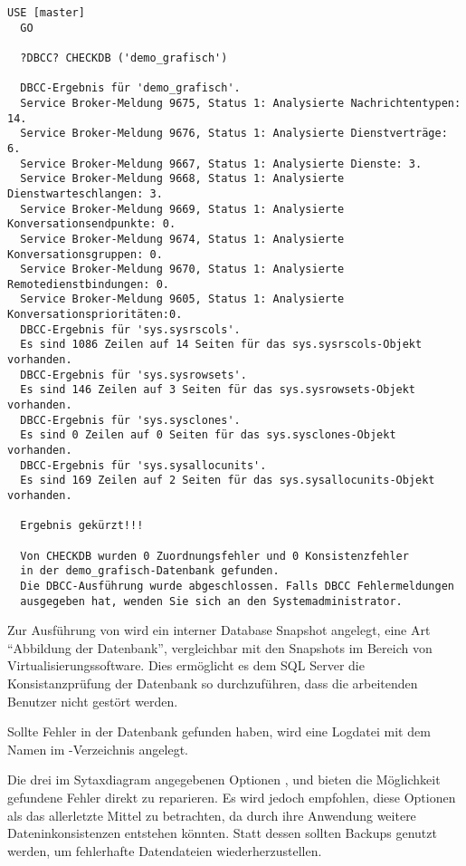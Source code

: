           \begin{lstlisting}[language=ms_sql,caption={Konsistenzprüfung einer
          Datenbank mit DBCC},label=admin03_30]
  USE [master]
  GO
  
  ?DBCC? CHECKDB ('demo_grafisch')
  
  DBCC-Ergebnis für 'demo_grafisch'.
  Service Broker-Meldung 9675, Status 1: Analysierte Nachrichtentypen: 14.
  Service Broker-Meldung 9676, Status 1: Analysierte Dienstverträge: 6.
  Service Broker-Meldung 9667, Status 1: Analysierte Dienste: 3.
  Service Broker-Meldung 9668, Status 1: Analysierte Dienstwarteschlangen: 3.
  Service Broker-Meldung 9669, Status 1: Analysierte Konversationsendpunkte: 0.
  Service Broker-Meldung 9674, Status 1: Analysierte Konversationsgruppen: 0.
  Service Broker-Meldung 9670, Status 1: Analysierte Remotedienstbindungen: 0.
  Service Broker-Meldung 9605, Status 1: Analysierte Konversationsprioritäten:0.
  DBCC-Ergebnis für 'sys.sysrscols'.
  Es sind 1086 Zeilen auf 14 Seiten für das sys.sysrscols-Objekt vorhanden.
  DBCC-Ergebnis für 'sys.sysrowsets'.
  Es sind 146 Zeilen auf 3 Seiten für das sys.sysrowsets-Objekt vorhanden.
  DBCC-Ergebnis für 'sys.sysclones'.
  Es sind 0 Zeilen auf 0 Seiten für das sys.sysclones-Objekt vorhanden.
  DBCC-Ergebnis für 'sys.sysallocunits'.
  Es sind 169 Zeilen auf 2 Seiten für das sys.sysallocunits-Objekt vorhanden.
  
  Ergebnis gekürzt!!!
  
  Von CHECKDB wurden 0 Zuordnungsfehler und 0 Konsistenzfehler 
  in der demo_grafisch-Datenbank gefunden.
  Die DBCC-Ausführung wurde abgeschlossen. Falls DBCC Fehlermeldungen
  ausgegeben hat, wenden Sie sich an den Systemadministrator.
          \end{lstlisting}
          Zur Ausführung von  wird ein interner Database
          Snapshot angelegt, eine Art \enquote{Abbildung der Datenbank},
          vergleichbar mit den Snapshots im Bereich von Virtualisierungssoftware.
          Dies ermöglicht es dem SQL Server die Konsistanzprüfung der Datenbank so
          durchzuführen, dass die arbeitenden Benutzer nicht gestört werden.
          
          Sollte  Fehler in der Datenbank gefunden haben,
          wird eine Logdatei mit dem Namen  im
          -Verzeichnis angelegt.
        
          Die drei im Sytaxdiagram angegebenen Optionen
          ,  und
           bieten die Möglichkeit gefundene Fehler
          direkt zu reparieren. Es wird jedoch empfohlen, diese Optionen als das
          allerletzte Mittel zu betrachten, da durch ihre Anwendung weitere
          Dateninkonsistenzen entstehen könnten. Statt dessen sollten Backups
          genutzt werden, um fehlerhafte Datendateien wiederherzustellen.
